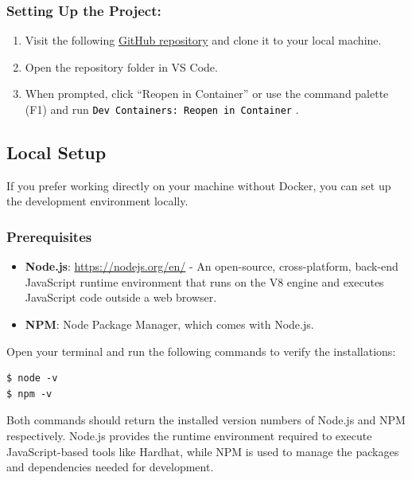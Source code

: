 \documentclass[12pt]{article}
\newcommand{\codegrey}[1]{%
  \texttt{\colorbox{black!4}{\textcolor{black}{#1}}}%
}
\begin{document}
\subsubsection*{Setting Up the Project:}

\begin{enumerate}
  \item Visit the following \href{https://github.com/radovluk/Smart-Contract-Exercise/tree/main/08-Maximal-Extractable-Value/task/task-code}{GitHub repository} and clone it to your local machine.
  \item Open the repository folder in VS Code.
  \item When prompted, click ``Reopen in Container'' or use the command palette (F1) and run \codegrey{Dev Containers: Reopen in Container}.
\end{enumerate}

\subsection{Local Setup}

If you prefer working directly on your machine without Docker, you can set up the development environment locally.

\subsubsection*{Prerequisites}
\begin{itemize}
    \item \textbf{Node.js}: \url{https://nodejs.org/en/} - An open-source, cross-platform, back-end JavaScript runtime environment that runs on the V8 engine and executes JavaScript code outside a web browser.
    \item \textbf{NPM}: Node Package Manager, which comes with Node.js.
\end{itemize}

\noindent
Open your terminal and run the following commands to verify the installations:

\begin{verbatim}
$ node -v
$ npm -v
\end{verbatim}

Both commands should return the installed version numbers of Node.js and NPM respectively. Node.js provides the runtime environment required to execute JavaScript-based tools like Hardhat, while NPM is used to manage the packages and dependencies needed for development.
\end{document}
